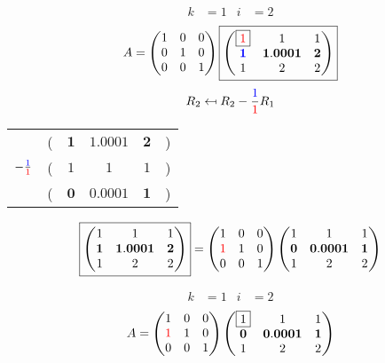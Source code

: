 \documentclass[pdf]{beamer}
\begin{document}
\begin{frame}{}\begin{align*} k &= 1 & i &= 2 \end{align*} $$A=\begin{pmatrix}1&0&0\\0&1&0\\0&0&1\end{pmatrix} \boxed{\begin{pmatrix}\boxed{{\color{red}1}}&1&1\\\mathbf{{\color{blue}1}}&\mathbf{1.0001}&\mathbf{2}\\1&2&2\end{pmatrix}} $$ $$R_2 \mapsfrom R_2 - \frac{{\color{blue}1}}{{\color{red}1}} R_1$$ \begin{center}\begin{tabular}{cccccc}  &(& $ \mathbf{1} $ & $ \mathbf{1.0001} $ & $ \mathbf{2} $ &)\\$ -\frac{{\color{blue}1}}{{\color{red}1}} $&(& $ 1 $ & $ 1 $ & $ 1 $ &)\\\hline  &(& $ \mathbf{0} $ & $ \mathbf{0.0001} $ & $ \mathbf{1} $ &) \end{tabular}\end{center} $$ \boxed{\begin{pmatrix}1&1&1\\\mathbf{1}&\mathbf{1.0001}&\mathbf{2}\\1&2&2\end{pmatrix}} = \begin{pmatrix}1&0&0\\{\color{red}1}&1&0\\0&0&1\end{pmatrix} \begin{pmatrix}1&1&1\\\mathbf{0}&\mathbf{0.0001}&\mathbf{1}\\1&2&2\end{pmatrix} $$\end{frame}
\begin{frame}{}\begin{align*} k &= 1 & i &= 2 \end{align*}$$A=\begin{pmatrix}1&0&0\\{\color{red}1}&1&0\\0&0&1\end{pmatrix} \begin{pmatrix}\boxed{1}&1&1\\\mathbf{0}&\mathbf{0.0001}&\mathbf{1}\\1&2&2\end{pmatrix} $$\end{frame}
\end{document}

